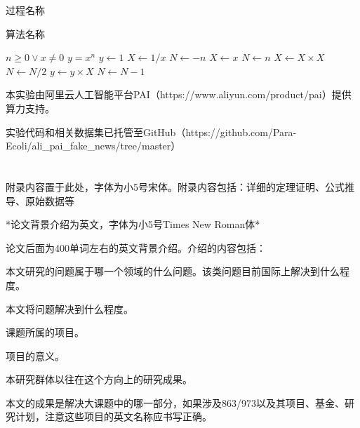 \documentclass{cjc}
\begin{document}
\begin{procedure}
  \caption{过程名称}
  \small
  \begin{algorithmic}
    \REQUIRE
    \ENSURE
    \STATE {}
  \end{algorithmic}
\end{procedure}

\begin{algorithm}
  \caption{算法名称}
  \small
  \begin{algorithmic}
    \REQUIRE $n \geq 0 \vee x \neq 0$
    \ENSURE $y = x^n$
    \STATE $y \leftarrow 1$
      \STATE $X \leftarrow 1 / x$
      \STATE $N \leftarrow -n$
    \ELSE
      \STATE $X \leftarrow x$
      \STATE $N \leftarrow n$
    \ENDIF
        \STATE $X \leftarrow X \times X$
        \STATE $N \leftarrow N / 2$
      \ELSE[$N$ is odd]
        \STATE $y \leftarrow y \times X$
        \STATE $N \leftarrow N - 1$
      \ENDIF
    \ENDWHILE
  \end{algorithmic}
\end{algorithm}



\begin{acknowledgments}

本实验由阿里云人工智能平台PAI（https://www.aliyun.com/product/pai）提供算力支持。

实验代码和相关数据集已托管至GitHub（https://github.com/Para-Ecoli/ali_pai_fake_news/tree/master）



\end{acknowledgments}








\newpage

\appendix

\section{}

附录内容置于此处，字体为小5号宋体。附录内容包括：详细的定理证明、公式推导、原始数据等


\makebiographies


\begin{background}
*论文背景介绍为英文，字体为小5号Times New Roman体*

论文后面为400单词左右的英文背景介绍。介绍的内容包括：

本文研究的问题属于哪一个领域的什么问题。该类问题目前国际上解决到什么程度。

本文将问题解决到什么程度。

课题所属的项目\cite{inproceedings_example,book_example}。

项目的意义。

本研究群体以往在这个方向上的研究成果。

本文的成果是解决大课题中的哪一部分，如果涉及863/973以及其项目、基金、研究计划，注意这些项目的英文名称应书写正确。
\end{background}
\end{document}
